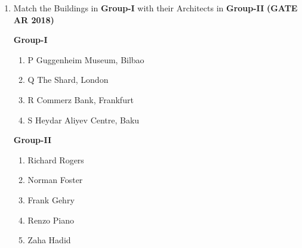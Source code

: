 \documentclass[journal,15pt,onecolumn]{IEEEtran}
\theoremstyle{remark}
\begin{document}
\begin{enumerate}
\begin{multicols}{2}
\textbf{Group-I}
\begin{enumerate}
    \item      \hspace{0.2cm} Brihadeshvara Temple
    \item      \hspace{0.2cm} Kailasanatha Temple
    \item      \hspace{0.2cm} Bhitargaon Temple
    \item      \hspace{0.2cm} Lad Khan Temple
\end{enumerate}
\columnbreak \noindent
\hspace{1cm} \textbf{Group-II}
\begin{enumerate}
    \item Gupta
    \item Chalukya
    \item Lodhi
    \item Chola
    \item Pallava
\end{enumerate}
\end{multicols}

\begin{multicols}{2}
\begin{enumerate}
    \item P-4, Q-5, R-1, S-2
    \item P-5, Q-1, R-2, S-3
    \item P-2, Q-5, R-1, S-3
    \item P-4, Q-1, R-2, S-5
\end{enumerate}
\end{multicols}



\item  Match the Buildings in \textbf{Group-I} with their Architects in \textbf{Group-II}\hfill \textbf{ (GATE AR 2018)}
\begin{multicols}{2}
    

\textbf{Group-I}
\begin{enumerate}
\item P Guggenheim Museum, Bilbao
\item Q The Shard, London
\item R Commerz Bank, Frankfurt
\item S Heydar Aliyev Centre, Baku
\end{enumerate}



\textbf{Group-II}
\begin{enumerate}
\item Richard Rogers
\item Norman Foster
\item Frank Gehry
\item Renzo Piano
\item Zaha Hadid
\end{enumerate}
\end{multicols}


\end{enumerate}
\end{document}
